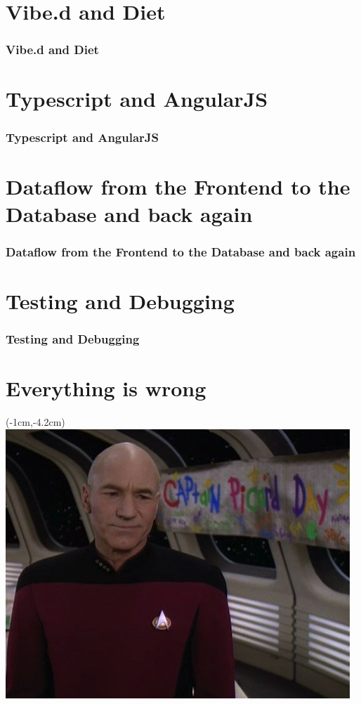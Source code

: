 \documentclass[notes,xelatex,13pt]{beamer}
\begin{document}
\section{Vibe.d and Diet}
\begin{frame}
	\frametitle{Vibe.d and Diet}
\end{frame}

\section{Typescript and AngularJS}
\begin{frame}
	\frametitle{Typescript and AngularJS}
\end{frame}

\section{Dataflow from the Frontend to the Database and back again}
\begin{frame}
	\frametitle{Dataflow from the Frontend to the Database and back again}
\end{frame}

\section{Testing and Debugging}
\begin{frame}
	\frametitle{Testing and Debugging}
\end{frame}

\section{Everything is wrong}
\begin{frame}
\begin{textblock*}{0cm}(-1cm,-4.2cm)
	\includegraphics[width=1.0\paperwidth]{picarddday.jpg}
\end{textblock*}
\end{frame}
\end{document}
